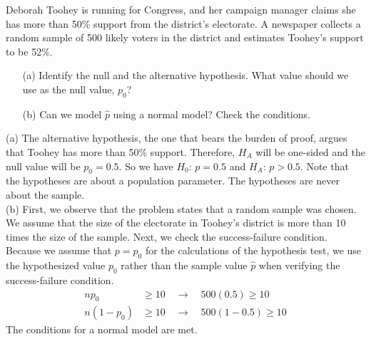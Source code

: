 \begin{examplewrap}
\begin{nexample}{Deborah Toohey is running for Congress, and her campaign manager claims she has more than 50\% support from the district's electorate. A newspaper collects a random sample of 500 likely voters in the district and estimates Toohey's support to be 52\%.
\begin{itemize}
\item[(a)] Identify the null and the alternative hypothesis. What value should we use as the null value, $p_{0}$?
\item[(b)] Can we model $\hat{p}$ using a normal model? Check the conditions.
\end{itemize}}
\label{TooheyTestNameAndConditionExample}
(a) The alternative hypothesis, the one that bears the burden of proof, argues that Toohey has more than 50\% support. Therefore, $H_A$ will be one-sided and the null value will be $p_0 = 0.5$. So we have $H_0$: $p = 0.5$ and $H_A$: $p > 0.5$. Note that the hypotheses are about a population parameter.  The hypotheses are never about the sample.\\[2mm]
(b) First, we observe that the problem states that a random sample was chosen.  We assume that the size of the electorate in Toohey's district is more than 10 times the size of the sample.  Next, we check the success-failure condition.    Because we assume that $p = p_0$ for the calculations of the hypothesis test, we use the hypothesized value $p_0$ rather than the sample value $\hat{p}$ when verifying the success-failure condition.  
\begin{align*}
np_0 &\geq 10 \quad \rightarrow \quad 500(0.5) \geq 10 \\
n(1-p_0) &\geq 10 \quad \rightarrow \quad 500(1-0.5) \geq 10
\end{align*}
The conditions for a normal model are met.
\end{nexample}
\end{examplewrap}


